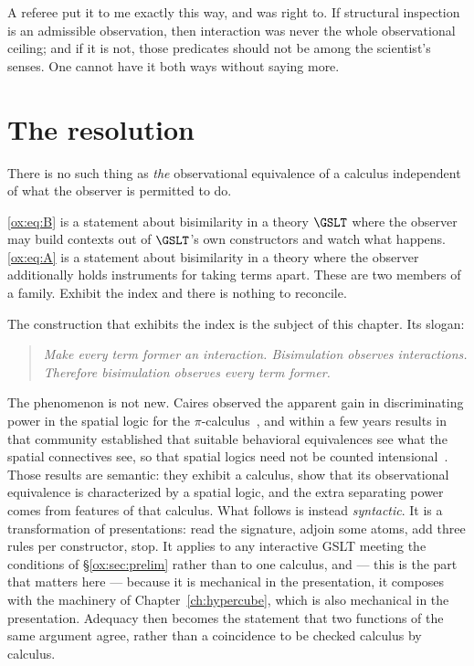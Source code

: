 A referee put it to me exactly this way, and was right to. If structural
inspection is an admissible observation, then interaction was never the whole
observational ceiling; and if it is not, those predicates should not be among the
scientist's senses. One cannot have it both ways without saying more.

\section{The resolution}
\label{ox:sec:resolution}

There is no such thing as \emph{the} observational equivalence of a calculus
independent of what the observer is permitted to do.

\eqref{ox:eq:B} is a statement about bisimilarity in a theory $\GSLT$ where the
observer may build contexts out of $\GSLT$'s own constructors and watch what
happens. \eqref{ox:eq:A} is a statement about bisimilarity in a theory where the
observer additionally holds instruments for taking terms apart. These are two
members of a family. Exhibit the index and there is nothing to reconcile.

The construction that exhibits the index is the subject of this chapter. Its
slogan:

\begin{quote}
\itshape
Make every term former an interaction. Bisimulation observes interactions.
Therefore bisimulation observes every term former.
\end{quote}

The phenomenon is not new. Caires observed the apparent gain in discriminating
power in the spatial logic for the $\pi$-calculus~\cite{Caires,CairesCardelli},
and within a few years results in that community established that suitable
behavioral equivalences see what the spatial connectives see, so that spatial
logics need not be counted intensional~\cite{Lozes,HirschkoffLozes}. Those results are semantic: they exhibit
a calculus, show that its observational equivalence is characterized by a spatial
logic, and the extra separating power comes from features of that calculus. What
follows is instead \emph{syntactic}. It is a transformation of presentations: read
the signature, adjoin some atoms, add three rules per constructor, stop. It applies
to any interactive GSLT meeting the conditions of \S\ref{ox:sec:prelim} rather than
to one calculus, and --- this is the part that matters here --- because it is
mechanical in the presentation, it composes with the machinery of
Chapter~\ref{ch:hypercube}, which is also mechanical in the presentation.
Adequacy then becomes the statement that two functions of the same argument agree,
rather than a coincidence to be checked calculus by calculus.

